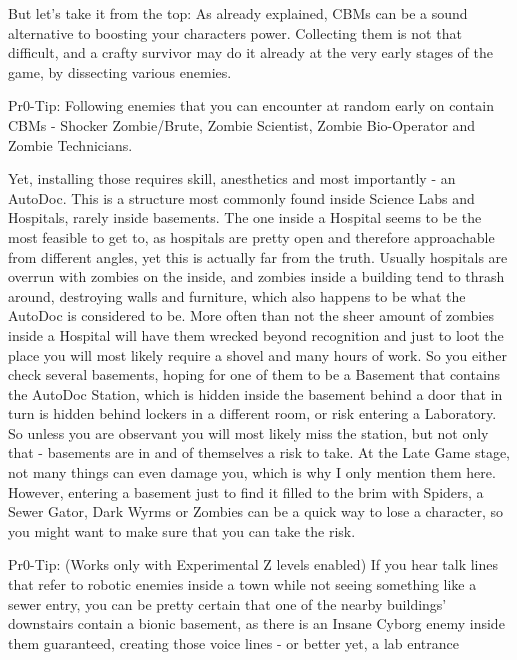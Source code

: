 \documentclass[11pt]{report}
\begin{document}
But let's take it from the top:
As already explained, CBMs can be a sound alternative to boosting your characters power. Collecting them is not that difficult, and a crafty survivor may do it already at the very early stages of the game, by dissecting various enemies.

Pr0-Tip: Following enemies that you can encounter at random early on contain CBMs - Shocker Zombie/Brute, Zombie Scientist, Zombie Bio-Operator and Zombie Technicians.

Yet, installing those requires skill, anesthetics and most importantly - an AutoDoc. This is a structure most commonly found inside Science Labs and Hospitals, rarely inside basements. The one inside a Hospital seems to be the most feasible to get to, as hospitals are pretty open and therefore approachable from different angles, yet this is actually far from the truth.
Usually hospitals are overrun with zombies on the inside, and zombies inside a building tend to thrash around, destroying walls and furniture, which also happens to be what the AutoDoc is considered to be. More often than not the sheer amount of zombies inside a Hospital will have them wrecked beyond recognition and just to loot the place you will most likely require a shovel and many hours of work.
So you either check several basements, hoping for one of them to be a Basement that contains the AutoDoc Station, which is hidden inside the basement behind a door that in turn is hidden behind lockers in a different room, or risk entering a Laboratory. So unless you are observant you will most likely miss the station, but not only that - basements are in and of themselves a risk to take. At the Late Game stage, not many things can even damage you, which is why I only mention them here. However, entering a basement just to find it filled to the brim with Spiders, a Sewer Gator, Dark Wyrms or Zombies can be a quick way to lose a character, so you might want to make sure that you can take the risk.

Pr0-Tip: (Works only with Experimental Z levels enabled) If you hear talk lines that refer to robotic enemies inside a town while not seeing something like a sewer entry, you can be pretty certain that one of the nearby buildings' downstairs contain a bionic basement, as there is an Insane Cyborg enemy inside them guaranteed, creating those voice lines - or better yet, a lab entrance
\end{document}
